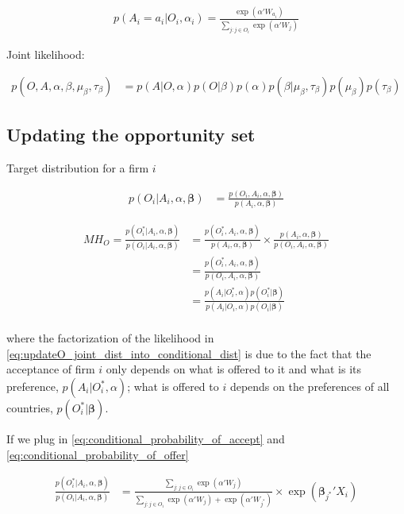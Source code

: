 \begin{align}
p(A_i = a_i | O_i, \alpha_i) = \frac{\exp(\alpha'W_{a_i})}{\sum\limits_{j:j \in O_i} \exp(\alpha'W_j)} \label{eq:conditional_probability_of_accept}
\end{align}

Joint likelihood:

\begin{align}
p(O, A, \alpha, \beta, \mu_{\beta}, \tau_{\beta}) &= p(A|O, \alpha) p(O|\beta) p(\alpha) p(\beta|\mu_{\beta}, \tau_{\beta}) p(\mu_{\beta}) p(\tau_{\beta}) 
\end{align}

\subsection{Updating the opportunity set}

Target distribution for a firm $i$ 

\begin{align}
p(O_i | A_i, \alpha, \bm{\beta}) &= \frac{p(O_i, A_i, \alpha, \bm{\beta})}{p(A_i, \alpha, \bm{\beta})}
\end{align}

\begin{align}
MH_O = \frac{p(O_i^* | A_i, \alpha, \bm{\beta})}{p(O_i | A_i, \alpha, \bm{\beta})} &= \frac{p(O_i^*, A_i, \alpha, \bm{\beta})}{p(A_i, \alpha, \bm{\beta})} \times \frac{p(A_i, \alpha, \bm{\beta})}{p(O_i, A_i, \alpha, \bm{\beta})} \\
&= \frac{p(O_i^*, A_i, \alpha, \bm{\beta})}{p(O_i, A_i, \alpha, \bm{\beta})} \\
&= \frac{p(A_i | O_i^*, \alpha)p(O_i^*|\bm{\beta})}{p(A_i | O_i, \alpha)p(O_i|\bm{\beta})} \label{eq:updateO_joint_dist_into_conditional_dist} \\
\end{align}

where the factorization of the likelihood in \eqref{eq:updateO_joint_dist_into_conditional_dist} is due to the fact that the acceptance of firm $i$ only depends on what is offered to it and what is its preference, $p(A_i | O_i^*, \alpha)$; what is offered to $i$ depends on the preferences of all countries, $p(O_i^* | \bm{\beta})$.

If we plug in \eqref{eq:conditional_probability_of_accept} and \eqref{eq:conditional_probability_of_offer}

\begin{align}
\frac{p(O_i^* | A_i, \alpha, \bm{\beta})}{p(O_i | A_i, \alpha, \bm{\beta})} &= \frac{\sum\limits_{j:j \in O_i} \exp(\alpha'W_j)}{\sum\limits_{j:j \in O_i} \exp(\alpha'W_j) + \exp(\alpha' W_{j^*})} \times \exp(\bm{\beta}_{j^*}'X_i)
\end{align}

